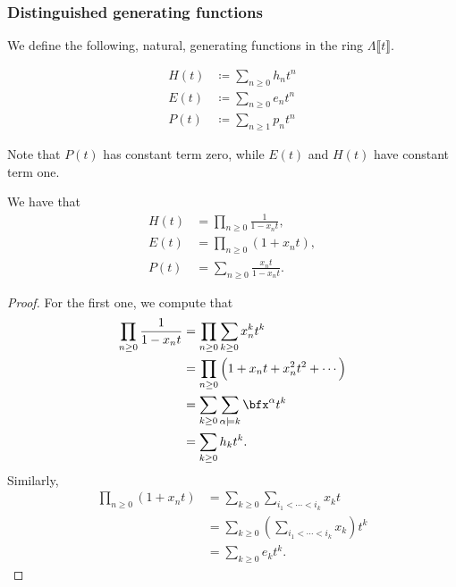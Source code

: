 \documentclass{article}
\begin{document}
\subsubsection{Distinguished generating functions}

We define the following, natural, generating functions in the ring $\Lambda \lBrack t \rBrack$.

\begin{definition}
    \begin{align*}
        H(t) &\coloneq \sum_{n\geq0}h_n t^n \\
        E(t) &\coloneq \sum_{n\geq0}e_n t^n \\
        P(t) &\coloneq \sum_{n\geq1}p_n t^n
    \end{align*}
\end{definition}

Note that $P(t)$ has constant term zero, while $E(t)$ and $H(t)$ have constant term one.

\begin{theorem}\label{thm:HEPPowerSeries}
    We have that
    \begin{align*}
        H(t) &= \prod_{n\geq0}\frac{1}{1-x_nt}, \\
        E(t) &= \prod_{n\geq0}(1+x_nt), \\
        P(t) &= \sum_{n\geq0}\frac{x_nt}{1-x_nt}.
    \end{align*}
\end{theorem}

\begin{proof}
    For the first one, we compute that
    \begin{align*}
        \prod_{n\geq0}\frac{1}{1-x_nt} &= \prod_{n\geq0}\sum_{k\geq0}x_n^kt^k\\
                                        &= \prod_{n \geq 0}\Big(1 + x_nt + x_n^2t^2 + \cdots\Big) \\
                                        &= \sum_{k \geq 0}\sum_{\alpha \models k} \bfx^\alpha t^k \\
                                        &= \sum_{k \geq 0} h_kt^k.
    \end{align*}
    Similarly,
    \begin{align*}
        \prod_{n\geq0}(1+x_nt) 
        &=
        \sum_{k \geq 0}
        \sum_{i_1 < \cdots < i_k}
        x_k
        t
        \\
        &= 
        \sum_{k \geq 0}
        \left(
            \sum_{i_1 < \cdots < i_k}
            x_k
        \right)
        t^k
        \\
        &=
        \sum_{k \geq 0}
        e_kt^k.
    \end{align*}
\end{proof}
\end{document}
